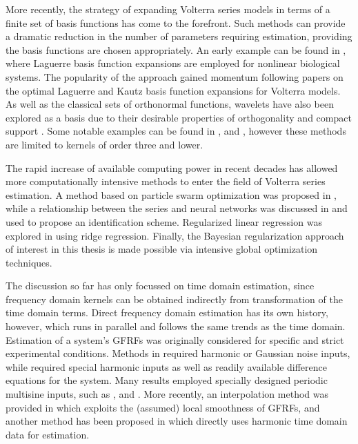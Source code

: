 More recently, the strategy of expanding Volterra series models in terms of a finite set of basis functions has come to the forefront. Such methods can provide a dramatic reduction in the number of parameters requiring estimation, providing the basis functions are chosen appropriately. An early example can be found in \cite{Marmarelis1993}, where Laguerre basis function expansions are employed for nonlinear biological systems. The popularity of the approach gained momentum following papers on the optimal Laguerre \cite{Campello2004} and Kautz \cite{Rosa2007} basis function expansions for Volterra models. As well as the classical sets of orthonormal functions, wavelets have also been explored as a basis due to their desirable properties of orthogonality and compact support \cite{Cheng2017}. Some notable examples can be found in \cite{Nikolaou2000}, \cite{Prazenica2004} and \cite{Prazenica2006}, however these methods are limited to kernels of order three and lower. 

The rapid increase of available computing power in recent decades has allowed more computationally intensive methods to enter the field of Volterra series estimation. A method based on particle swarm optimization was proposed in \cite{Chang2012}, while a relationship between the series and neural networks was discussed in \cite{Wray1994} and used to propose an identification scheme. Regularized linear regression was explored in \cite{Franz2006} using ridge regression. Finally, the Bayesian regularization approach \cite{Birpoutsoukis2017} of interest in this thesis is made possible via intensive global optimization techniques.

The discussion so far has only focussed on time domain estimation, since frequency domain kernels can be obtained indirectly from transformation of the time domain terms. Direct frequency domain estimation has its own history, however, which runs in parallel and follows the same trends as the time domain. Estimation of a system's GFRFs was originally considered for specific and strict experimental conditions. Methods in \cite{Bedrosian1971} required harmonic or Gaussian noise inputs, while \cite{Jones1989} required special harmonic inputs as well as readily available difference equations for the system. Many results employed specially designed periodic multisine inputs, such as \cite{Boyd1983}, \cite{Chua1989} and \cite{Evans1996}. More recently, an interpolation method was provided in \cite{Nemeth2002} which exploits the (assumed) local smoothness of GFRFs, and another method has been proposed in \cite{Li2011} which directly uses harmonic time domain data for estimation.       

